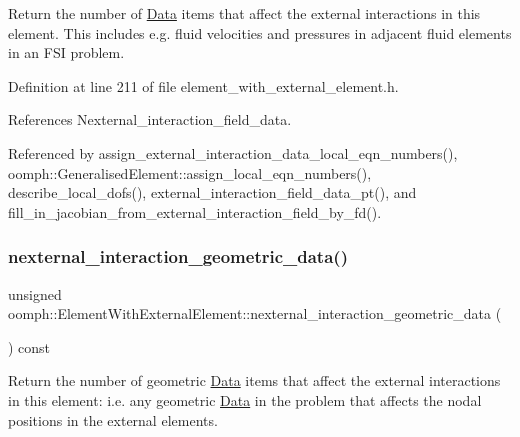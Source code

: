 Return the number of \hyperlink{classoomph_1_1Data}{Data} items that affect the external interactions in this element. This includes e.\+g. fluid velocities and pressures in adjacent fluid elements in an F\+SI problem. 



Definition at line 211 of file element\+\_\+with\+\_\+external\+\_\+element.\+h.



References Nexternal\+\_\+interaction\+\_\+field\+\_\+data.



Referenced by assign\+\_\+external\+\_\+interaction\+\_\+data\+\_\+local\+\_\+eqn\+\_\+numbers(), oomph\+::\+Generalised\+Element\+::assign\+\_\+local\+\_\+eqn\+\_\+numbers(), describe\+\_\+local\+\_\+dofs(), external\+\_\+interaction\+\_\+field\+\_\+data\+\_\+pt(), and fill\+\_\+in\+\_\+jacobian\+\_\+from\+\_\+external\+\_\+interaction\+\_\+field\+\_\+by\+\_\+fd().

\mbox{\label{classoomph_1_1ElementWithExternalElement_a4688ff13802ca29d654f925f6697df87}} 
\subsubsection{\texorpdfstring{nexternal\+\_\+interaction\+\_\+geometric\+\_\+data()}{nexternal\_interaction\_geometric\_data()}}
{\footnotesize\ttfamily unsigned oomph\+::\+Element\+With\+External\+Element\+::nexternal\+\_\+interaction\+\_\+geometric\+\_\+data (\begin{DoxyParamCaption}{ }\end{DoxyParamCaption}) const\hspace{0.3cm}{\ttfamily [inline]}}



Return the number of geometric \hyperlink{classoomph_1_1Data}{Data} items that affect the external interactions in this element\+: i.\+e. any geometric \hyperlink{classoomph_1_1Data}{Data} in the problem that affects the nodal positions in the external elements. 



